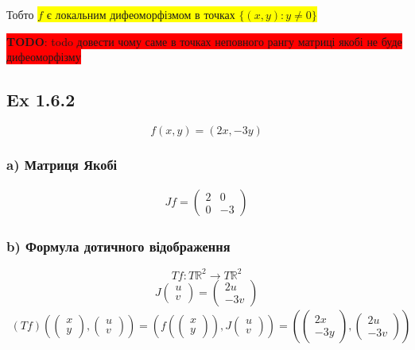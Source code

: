 \documentclass[10pt, a4paper]{article} %
\newcommand{\R}{\mathbb{R}}
\newcommand{\todo}[1]{\colorbox{red}{\textbf{TODO}: #1}}
\begin{document}
Тобто \colorbox{yellow}{$f$ є локальним дифеоморфізмом в точках $\{(x,y) : y\ne 0\}$}

\todo{todo довести чому саме в точках неповного рангу матриці якобі не буде дифеоморфізму}

\subsection*{Ex 1.6.2}
\[f(x,y) = (2x,-3y)\]
\subsubsection*{a) Матриця Якобі}
\begin{align*}
    Jf = \begin{pmatrix}
        2 & 0\\
        0 & -3
    \end{pmatrix}
\end{align*}

\subsubsection*{b) Формула дотичного відображення}
\[Tf : T\R^2 \to T\R^2\]
\[J\begin{pmatrix}u\\v\end{pmatrix} = \begin{pmatrix}2u\\-3v\end{pmatrix}\]
\begin{align*}
    (Tf)\left(\begin{pmatrix}x\\y\end{pmatrix} , \begin{pmatrix}u\\v\end{pmatrix}\right)
    = \left(f(\begin{pmatrix}x\\y\end{pmatrix}) , J\begin{pmatrix}u\\v\end{pmatrix}\right)
    = \left(\begin{pmatrix}2x\\-3y\end{pmatrix} , \begin{pmatrix}2u\\-3v\end{pmatrix}\right)
\end{align*}
\end{document}
